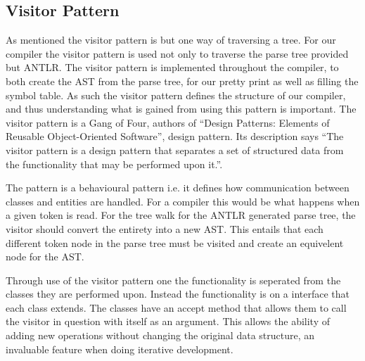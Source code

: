 \subsection*{Visitor Pattern}\label{subs:visit}
As mentioned the visitor pattern is but one way of traversing a tree.
For our compiler the visitor pattern is used not only to traverse the parse tree provided but ANTLR.
The visitor pattern is implemented throughout the compiler, to both create the AST from the parse tree, for our pretty print as well as filling the symbol table.
As such the visitor pattern defines the structure of our compiler, and thus understanding what is gained from using this pattern is important.
The visitor pattern is a Gang of Four, authors of ``Design Patterns: Elements of Reusable Object-Oriented Software'', design pattern.
Its description says ``The visitor pattern is a design pattern that separates a set of structured data from the functionality that may be performed upon it.''. %

The pattern is a behavioural pattern i.e. it defines how communication between classes and entities are handled.
For a compiler this would be what happens when a given token is read.
For the tree walk for the ANTLR generated parse tree, the visitor should convert the entirety into a new AST.
This entails that each different token node in the parse tree must be visited and create an equivelent node for the AST.

Through use of the visitor pattern one the functionality is seperated from the classes they are performed upon.
Instead the functionality is on a interface that each class extends.
The classes have an accept method that allows them to call the visitor in question with itself as an argument.
This allows the ability of adding new operations without changing the original data structure, an invaluable feature when doing iterative development.


